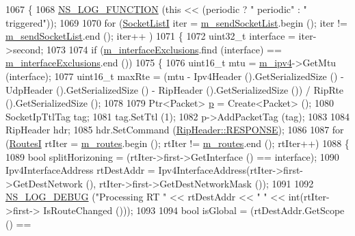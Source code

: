 \begin{DoxyCode}
1067 \{
1068   \hyperlink{log-macros-disabled_8h_a90b90d5bad1f39cb1b64923ea94c0761}{NS\_LOG\_FUNCTION} (\textcolor{keyword}{this} << (periodic ? \textcolor{stringliteral}{" periodic"} : \textcolor{stringliteral}{" triggered"}));
1069 
1070   \textcolor{keywordflow}{for} (\hyperlink{classns3_1_1Rip_a0395b3977eeeb90190ccfa5758a3957f}{SocketListI} iter = \hyperlink{classns3_1_1Rip_a58b5f6ebcee2ed04249fd025abfa61cb}{m\_sendSocketList}.begin (); iter != 
      \hyperlink{classns3_1_1Rip_a58b5f6ebcee2ed04249fd025abfa61cb}{m\_sendSocketList}.end (); iter++ )
1071     \{
1072       uint32\_t \textcolor{keyword}{interface }= iter->second;
1073 
1074       \textcolor{keywordflow}{if} (\hyperlink{classns3_1_1Rip_a30e2c00645f24a3b29be981f5d592773}{m\_interfaceExclusions}.find (interface) == 
      \hyperlink{classns3_1_1Rip_a30e2c00645f24a3b29be981f5d592773}{m\_interfaceExclusions}.end ())
1075         \{
1076           uint16\_t mtu = \hyperlink{classns3_1_1Rip_a6e2c0e74d2fa8643d223db26621dd7f1}{m\_ipv4}->GetMtu (interface);
1077           uint16\_t maxRte = (mtu - Ipv4Header ().GetSerializedSize () - UdpHeader ().GetSerializedSize () -
       RipHeader ().GetSerializedSize ()) / RipRte ().GetSerializedSize ();
1078 
1079           Ptr<Packet> \hyperlink{lte__link__budget_8m_ac9de518908a968428863f829398a4e62}{p} = Create<Packet> ();
1080           SocketIpTtlTag tag;
1081           tag.SetTtl (1);
1082           p->AddPacketTag (tag);
1083 
1084           RipHeader hdr;
1085           hdr.SetCommand (\hyperlink{classns3_1_1RipHeader_a8c6ce779ee35c8b65446aaa202a6e789a9f13028e2d4a57da73f592702d7b17c7}{RipHeader::RESPONSE});
1086 
1087           \textcolor{keywordflow}{for} (\hyperlink{classns3_1_1Rip_a8819af4dd44f270b6b19be755b39bce8}{RoutesI} rtIter = \hyperlink{classns3_1_1Rip_aea6c918ae311cd88fb2bfb714d6f9c30}{m\_routes}.begin (); rtIter != 
      \hyperlink{classns3_1_1Rip_aea6c918ae311cd88fb2bfb714d6f9c30}{m\_routes}.end (); rtIter++)
1088             \{
1089               \textcolor{keywordtype}{bool} splitHorizoning = (rtIter->first->GetInterface () == interface);
1090               Ipv4InterfaceAddress rtDestAddr = Ipv4InterfaceAddress(rtIter->first->GetDestNetwork (), 
      rtIter->first->GetDestNetworkMask ());
1091 
1092               \hyperlink{group__logging_ga413f1886406d49f59a6a0a89b77b4d0a}{NS\_LOG\_DEBUG} (\textcolor{stringliteral}{"Processing RT "} << rtDestAddr << \textcolor{stringliteral}{" "} << \textcolor{keywordtype}{int}(rtIter->first->
      IsRouteChanged ()));
1093 
1094               \textcolor{keywordtype}{bool} isGlobal = (rtDestAddr.GetScope () == 

\end{DoxyCode}
